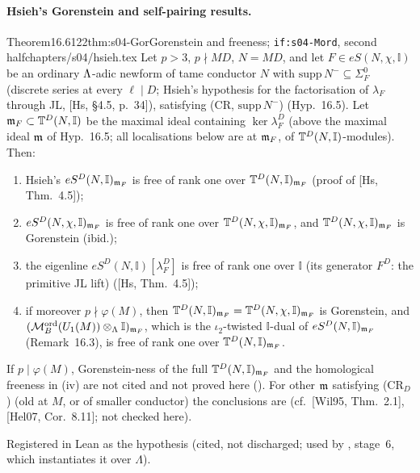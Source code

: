 \paragraph{Hsieh's Gorenstein and self-pairing results.}
\begin{quoted}{Theorem}{16.6}{122}{thm:s04-Gor}{Gorenstein and freeness; \texttt{if:s04-Mord}, second half}{chapters/s04/hsieh.tex}\label{rpt:thm:s04-Gor}
Let $p>3$, $p\nmid MD$, $N=MD$, and let $F\in eS(N,\chi,\mathbb I)$ be an ordinary $\Lambda$-adic newform of tame conductor $N$ with
$\mathrm{supp}\,N^-\subseteq\Sigma^0_F$ (discrete series at every $\ell\mid D$; Hsieh's hypothesis for the factorisation of
$\lambda_F$ through JL, [Hs, \S4.5, p.~34]), satisfying (CR, $\mathrm{supp}\,N^-$) (Hyp.~16.5). Let $\mathfrak{m}_F\subset\mathbb{T}^D(N,\mathbb I)$
be the maximal ideal containing $\ker\lambda^D_F$ (above the maximal ideal $\mathfrak{m}$ of Hyp.~16.5; all localisations below are
at $\mathfrak{m}_F$, of $\mathbb{T}^D(N,\mathbb I)$-modules). Then:
\begin{enumerate}[label=(\roman*)]
\item Hsieh's $eS^D(N,\mathbb I)_{\mathfrak{m}_F}$ is free of rank one over $\mathbb{T}^D(N,\mathbb I)_{\mathfrak{m}_F}$ (proof of [Hs, Thm.~4.5]);
\item $eS^D(N,\chi,\mathbb I)_{\mathfrak{m}_F}$ is free of rank one over $\mathbb{T}^D(N,\chi,\mathbb I)_{\mathfrak{m}_F}$, and $\mathbb{T}^D(N,\chi,\mathbb I)_{\mathfrak{m}_F}$ is
  Gorenstein (ibid.);
\item the eigenline $eS^D(N,\mathbb I)[\lambda^D_F]$ is free of rank one over $\mathbb I$ (its generator $F^D$: the primitive JL lift)
  ([Hs, Thm.~4.5]);
\item if moreover $p\nmid\varphi(M)$, then $\mathbb{T}^D(N,\mathbb I)_{\mathfrak{m}_F}=\mathbb{T}^D(N,\chi,\mathbb I)_{\mathfrak{m}_F}$ is Gorenstein, and
  $(\mathcal{M}^{\mathrm{ord}}_B(U_1(M))\otimes_\Lambda\mathbb I)_{\mathfrak{m}_F}$, which is the $\iota_2$-twisted $\mathbb I$-dual of $eS^D(N,\mathbb I)_{\mathfrak{m}_F}$
  (Remark~16.3), is free of rank one over $\mathbb{T}^D(N,\mathbb I)_{\mathfrak{m}_F}$.
\end{enumerate}
If $p\mid\varphi(M)$, Gorenstein-ness of the full $\mathbb{T}^D(N,\mathbb I)_{\mathfrak{m}_F}$ and the homological freeness in (iv) are not cited and
not proved here (\stexp). For other $\mathfrak{m}$ satisfying (CR$_D$) (old at $M$, or of smaller conductor) the conclusions are \stexp{}
(cf.\ [Wil95, Thm.~2.1], [Hel07, Cor.~8.11]; not checked here).
\par\smallskip{}\par
\noindent Registered in Lean as the hypothesis  (cited, not discharged; used by , stage~6, which instantiates it over $\Lambda$).

\end{quoted}
